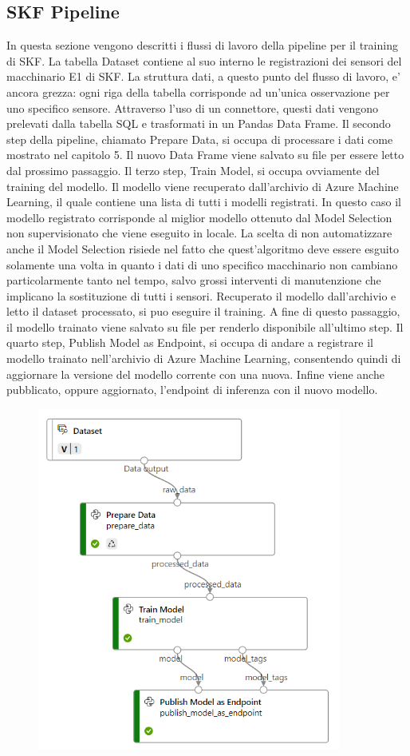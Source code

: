 \subsection{SKF Pipeline}
In questa sezione vengono descritti i flussi di lavoro della pipeline per il training di SKF.
La tabella Dataset contiene al suo interno le registrazioni dei sensori del macchinario E1 di SKF. La struttura dati, a questo punto del flusso di lavoro, e' ancora grezza: ogni riga della tabella corrisponde ad un'unica osservazione per uno specifico sensore. Attraverso l'uso di un connettore, questi dati vengono prelevati dalla tabella SQL e trasformati in un Pandas Data Frame.
Il secondo step della pipeline, chiamato Prepare Data, si occupa di processare i dati come mostrato nel capitolo 5. Il nuovo Data Frame viene salvato su file per essere letto dal prossimo passaggio.
Il terzo step, Train Model, si occupa ovviamente del training del modello. Il modello viene recuperato dall'archivio di Azure Machine Learning, il quale contiene una lista di tutti i modelli registrati. In questo caso il modello registrato corrisponde al miglior modello ottenuto dal Model Selection non supervisionato che viene eseguito in locale. La scelta di non automatizzare anche il Model Selection risiede nel fatto che quest'algoritmo deve essere esguito solamente una volta in quanto i dati di uno specifico macchinario non cambiano particolarmente tanto nel tempo, salvo grossi interventi di manutenzione che implicano la sostituzione di tutti i sensori.
Recuperato il modello dall'archivio e letto il dataset processato, si puo eseguire il training. A fine di questo passaggio, il modello trainato viene salvato su file per renderlo disponibile all'ultimo step.
Il quarto step, Publish Model as Endpoint, si occupa di andare a registrare il modello trainato nell'archivio di Azure Machine Learning, consentendo quindi di aggiornare la versione del modello corrente con una nuova. Infine viene anche pubblicato, oppure aggiornato, l'endpoint di inferenza con il nuovo modello.
\begin{figure}[t]
\includegraphics[width=10cm, scale=1]{images/pipeline}
\centering
\end{figure}

